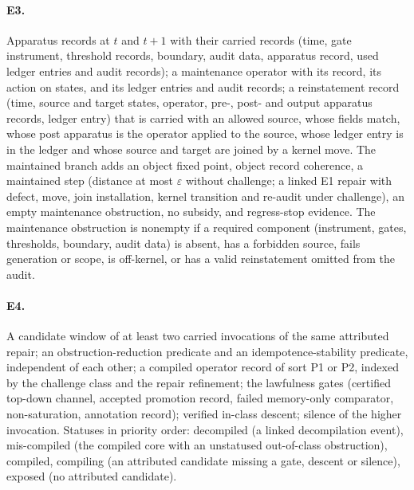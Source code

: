 \paragraph{E3.} Apparatus records at $t$ and $t+1$ with their carried records (time, gate instrument,
threshold records, boundary, audit data, apparatus record, used ledger entries and audit records); a
maintenance operator with its record, its action on states, and its ledger entries and audit records;
a reinstatement record (time, source and target states, operator, pre-, post- and output apparatus
records, ledger entry) that is carried with an allowed source, whose fields match, whose post
apparatus is the operator applied to the source, whose ledger entry is in the ledger and whose source
and target are joined by a kernel move. The maintained branch adds an object fixed point, object
record coherence, a maintained step (distance at most $\varepsilon$ without challenge; a linked E1
repair with defect, move, join installation, kernel transition and re-audit under challenge), an empty
maintenance obstruction, no subsidy, and regress-stop evidence. The maintenance obstruction is
nonempty if a required component (instrument, gates, thresholds, boundary, audit data) is absent,
has a forbidden source, fails generation or scope, is off-kernel, or has a valid reinstatement omitted
from the audit.

\paragraph{E4.} A candidate window of at least two carried invocations of the same attributed
repair; an obstruction-reduction predicate and an idempotence-stability predicate, independent of
each other; a compiled operator record of sort P1 or P2, indexed by the challenge class and the repair
refinement; the lawfulness gates (certified top-down channel, accepted promotion record, failed
memory-only comparator, non-saturation, annotation record); verified in-class descent; silence of the
higher invocation. Statuses in priority order: decompiled (a linked decompilation event),
mis-compiled (the compiled core with an unstatused out-of-class obstruction), compiled, compiling
(an attributed candidate missing a gate, descent or silence), exposed (no attributed candidate).

